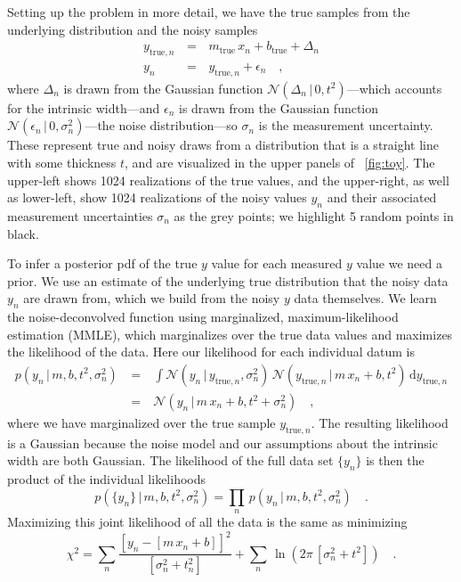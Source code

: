\documentclass[modern]{aastex61}
\newcommand{\given}{\,|\,}
\newcommand{\dd}{\mathrm{d}}
\newcommand{\true}{\mathrm{true}}
\begin{document}
Setting up the problem in more detail, we have the true samples from the underlying distribution and the noisy samples
\begin{eqnarray}
y_{\true, n} \, &=& \, m_{\true}\,x_n + b_{\true} + \Delta_n \\
y_n \, &=& \, y_{\true,n} + \epsilon_n \quad,
\label{eq:ytrue}
\end{eqnarray}
where $\Delta_n$ is drawn from the Gaussian function $\mathcal{N}(\Delta_n \given 0, t^2)$---which accounts for the intrinsic width---and $\epsilon_n$ is drawn from the Gaussian function $\mathcal{N}(\epsilon_n \given 0, \sigma_n^2)$---the noise distribution---so $\sigma_n$ is the measurement uncertainty.
These represent true and noisy draws from a distribution that is a straight line with some thickness $t$, and are visualized in the upper panels of \figurename~\ref{fig:toy}.
The upper-left shows 1024 realizations of the true values, and the upper-right, as well as lower-left, show 1024 realizations of the noisy values $y_n$ and their associated measurement uncertainties $\sigma_n$ as the grey points; we highlight 5 random points in black.

To infer a posterior pdf of the true $y$ value for each measured $y$ value we need a prior. We use an estimate of the underlying true distribution that the noisy data $y_n$ are drawn from, which we build from the noisy $y$ data themselves.
We learn the noise-deconvolved function using marginalized, maximum-likelihood estimation (MMLE), which marginalizes over the true data values and maximizes the likelihood of the data. Here our likelihood for each individual datum is
\begin{eqnarray}
p(y_n \given m, b, t^2, \sigma_n^2) \ &=& \ \int \mathcal{N}(y_n \given y_{\true,n}, \sigma_n^2) \, \mathcal{N}(y_{\true,n} \given m\,x_n + b, t^2 ) \, \dd y_{\true, n} \\
&=&  \ \mathcal{N}(y_n \given m\,x_n + b, t^2 + \sigma_n^2) \quad,
\label{eq:toyLike}
\end{eqnarray}
where we have marginalized over the true sample $y_{\true, n}$. The resulting likelihood is a Gaussian because the noise model and our assumptions about the intrinsic width are both Gaussian. The likelihood of the full data set $\{y_n\}$ is then the product of the individual likelihoods
\begin{equation}
p(\{y_n\} \given m, b, t^2, \sigma_n^2) = \prod_n\, p(y_n \given m, b, t^2, \sigma_n^2) \quad .
\label{eq:toyLikeFull}
\end{equation}
Maximizing this joint likelihood of all the data is the same as minimizing
\begin{equation}
\chi^2 = \sum_n \frac{[y_n - [m\,x_n + b]]^2}{[\sigma_n^2 + t_n^2]} + \sum_n\,\ln(2\pi\,[\sigma_n^2 + t^2])
\quad .
\label{eq:chisq}
\end{equation}
\end{document}
